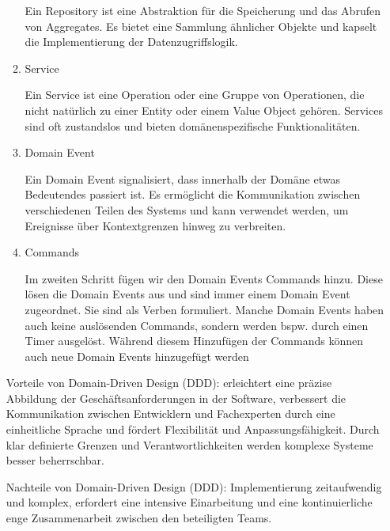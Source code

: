 \documentclass{article}
\begin{document}
\begin{enumerate}[label=\alph*)]
\begin{enumerate}[label=\arabic*)]
Ein Repository ist eine Abstraktion für die Speicherung und das Abrufen von Aggregates. Es bietet eine Sammlung ähnlicher Objekte und kapselt die Implementierung der Datenzugriffslogik.
\item Service

Ein Service ist eine Operation oder eine Gruppe von Operationen, die nicht natürlich zu einer Entity oder einem Value Object gehören. Services sind oft zustandslos und bieten domänenspezifische Funktionalitäten.
\item Domain Event

Ein Domain Event signalisiert, dass innerhalb der Domäne etwas Bedeutendes passiert ist. Es ermöglicht die Kommunikation zwischen verschiedenen Teilen des Systems und kann verwendet werden, um Ereignisse über Kontextgrenzen hinweg zu verbreiten.
\item Commands

Im zweiten Schritt fügen wir den Domain Events Commands hinzu. Diese lösen die Domain Events aus und
sind immer einem Domain Event zugeordnet. Sie sind als Verben formuliert. Manche Domain Events haben
auch keine auslösenden Commands, sondern werden bspw. durch einen Timer ausgelöst.
Während diesem Hinzufügen der Commands können auch neue Domain Events hinzugefügt werden
   \end{enumerate}
   
Vorteile von Domain-Driven Design (DDD):
erleichtert eine präzise Abbildung der Geschäftsanforderungen in der Software, verbessert die Kommunikation zwischen Entwicklern und Fachexperten durch eine einheitliche Sprache und fördert Flexibilität und Anpassungsfähigkeit. Durch klar definierte Grenzen und Verantwortlichkeiten werden komplexe Systeme besser beherrschbar.

Nachteile von Domain-Driven Design (DDD):
Implementierung zeitaufwendig und komplex, erfordert eine intensive Einarbeitung und eine kontinuierliche enge Zusammenarbeit zwischen den beteiligten Teams.


\end{enumerate}
\end{document}
